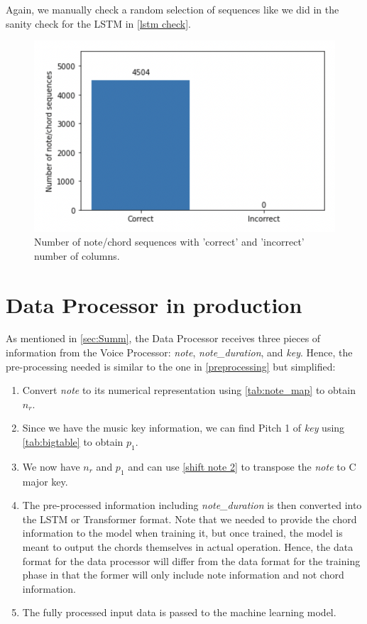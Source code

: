 Again, we manually check a random selection of sequences like we did in the sanity check for the LSTM in \cref{lstm check}.

\begin{figure}
    \centering
    \includegraphics{Figures/Transformer check}
    \decoRule
    \caption{Number of note/chord sequences with 'correct' and 'incorrect' number of columns.}
    \label{fig:Transformer check}
    \end{figure}


\section{Data Processor in production}
\label{data processor}
As mentioned in \cref{sec:Summ}, the Data Processor receives three pieces of information from the Voice Processor: \emph{note}, \emph{note\_duration}, and \emph{key}. Hence, the pre-processing needed is similar to the one in \cref{preprocessing} but simplified:

\begin{enumerate}
    \item Convert \emph{note} to its numerical representation using \cref{tab:note_map} to obtain $n_r$.
    \item Since we have the music key information, we can find Pitch 1 of \emph{key} using \cref{tab:bigtable} to obtain $p_1$.
    \item We now have $n_r$ and $p_1$ and can use \cref{shift note 2} to transpose the \emph{note} to C major key.
    \item The pre-processed information including \emph{note\_duration} is then converted into the LSTM or Transformer format. Note that we needed to provide the chord information to the model when training it, but once trained, the model is meant to output the chords themselves in actual operation. Hence, the data format for the data processor will differ from the data format for the training phase in that the former will only include note information and not chord information.
    \item The fully processed input data is passed to the machine learning model.
  \end{enumerate}

